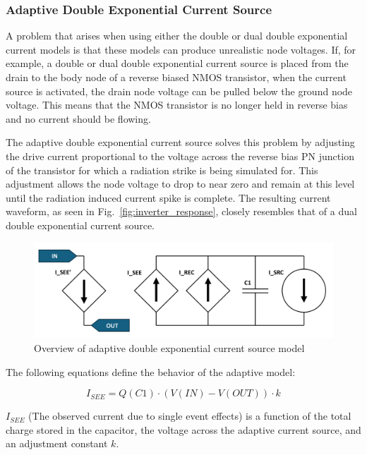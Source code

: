 \documentclass[conference]{IEEEtran}
\begin{document}
    \subsubsection{Adaptive Double Exponential Current Source}
    A problem that arises when using either the double or dual double exponential current models is that these models can produce unrealistic node voltages.
    If, for example, a double or dual double exponential current source is placed from the drain to the body node of a reverse biased NMOS transistor, when the current source is activated, the drain node voltage can be pulled below the ground node voltage.
    This means that the NMOS transistor is no longer held in reverse bias and no current should be flowing.

    The adaptive double exponential current source solves this problem by adjusting the drive current proportional to the voltage across the reverse bias PN junction of the transistor for which a radiation strike is being simulated for.
    This adjustment allows the node voltage to drop to near zero and remain at this level until the radiation induced current spike is complete.
    The resulting current waveform, as seen in Fig.~\ref{fig:inverter_response}, closely resembles that of a dual double exponential current source.

    \begin{figure}[htbp]
        \centering
        \includegraphics[width=0.95\linewidth]{Adaptive_Model_Cropped}
        \caption{Overview of adaptive double exponential current source model \cite{Kauppila2009}}
        \label{fig:adaptive_model_overview}
    \end{figure}

    The following equations define the behavior of the adaptive model:

    \begin{equation}
        I_{SEE} = Q(C1) \cdot (V(IN) - V(OUT)) \cdot k\label{eq:ISEE}
    \end{equation}

    \(I_{SEE}\) (The observed current due to single event effects) is a function of the total charge stored in the capacitor, the voltage across the adaptive current source, and an adjustment constant \(k\).
\end{document}

